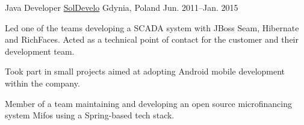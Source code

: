 \begin{cventries}
  \cventry
    {Java Developer} %
    {\href{https://www.soldevelo.com}{SolDevelo}} %
    {Gdynia, Poland} %
    {Jun. 2011–Jan. 2015} %
    {
      \begin{cvitems} %
        \item {Led one of the teams developing a SCADA system with JBoss Seam, Hibernate and RichFaces. Acted as a technical point of contact for the customer and their development team.}
        \item {Took part in small projects aimed at adopting Android mobile development within the company.}
        \item {Member of a team maintaining and developing an open source microfinancing system Mifos using a Spring-based tech stack.}
      \end{cvitems}
    }

\end{cventries}
